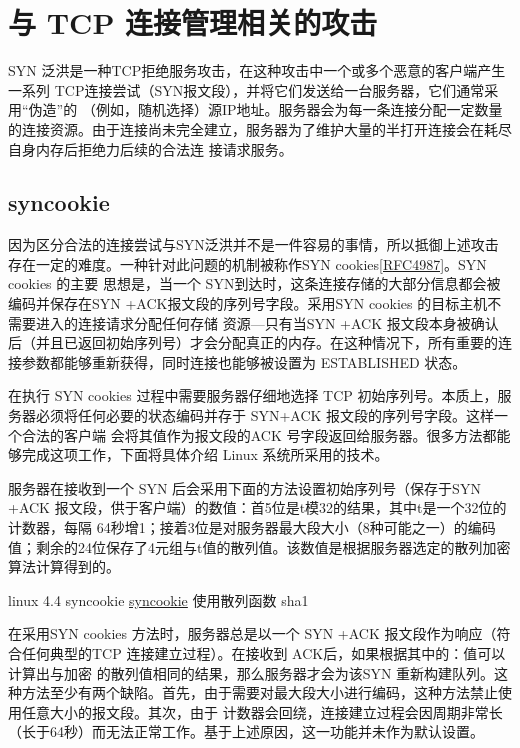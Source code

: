 \section{与 TCP 连接管理相关的攻击}
SYN 泛洪是一种TCP拒绝服务攻击，在这种攻击中一个或多个恶意的客户端产生一系列
TCP连接尝试（SYN报文段），并将它们发送给一台服务器，它们通常采用“伪造”的
（例如，随机选择）源IP地址。服务器会为每一条连接分配一定数量的连接资源。由于连接尚未完全建立，服务器为了维护大量的半打开连接会在耗尽自身内存后拒绝力后续的合法连
接请求服务。

\subsection{syncookie}
因为区分合法的连接尝试与SYN泛洪并不是一件容易的事情，所以抵御上述攻击存在一定的难度。一种针对此问题的机制被称作SYN
cookies\href{https://www.rfc-editor.org/rfc/rfc4987}{[RFC4987]}。SYN cookies 的主要
思想是，当一个 SYN到达时，这条连接存储的大部分信息都会被编码并保存在SYN +ACK报文段的序列号字段。采用SYN cookies
的目标主机不需要进入的连接请求分配任何存储
资源—只有当SYN +ACK
报文段本身被确认后（并且已返回初始序列号）才会分配真正的内存。在这种情况下，所有重要的连接参数都能够重新获得，同时连接也能够被设置为
ESTABLISHED 状态。

在执行 SYN cookies 过程中需要服务器仔细地选择 TCP 初始序列号。本质上，服务器必须将任何必要的状态编码并存于
SYN+ACK 报文段的序列号字段。这样一个合法的客户端
会将其值作为报文段的ACK 号字段返回给服务器。很多方法都能够完成这项工作，下面将具体介绍 Linux 系统所采用的技术。

服务器在接收到一个 SYN 后会采用下面的方法设置初始序列号（保存于SYN +ACK
报文段，供于客户端）的数值：首5位是t模32的结果，其中t是一个32位的计数器，每隔
64秒增1；接着3位是对服务器最大段大小（8种可能之一）的编码值；剩余的24位保存了4元组与t值的散列值。该数值是根据服务器选定的散列加密算法计算得到的。

\begin{tcolorbox}[title = {Note}]
  linux 4.4 syncookie
  \href{https://elixir.bootlin.com/linux/v4.4.302/source/net/ipv4/syncookies.c#L108}{syncookie}
  使用散列函数 sha1
\end{tcolorbox}

在采用SYN cookies 方法时，服务器总是以一个 SYN +ACK 报文段作为响应（符合任何典型的TCP 连接建立过程）。在接收到
ACK后，如果根据其中的：值可以计算出与加密
的散列值相同的结果，那么服务器才会为该SYN
重新构建队列。这种方法至少有两个缺陷。首先，由于需要对最大段大小进行编码，这种方法禁止使用任意大小的报文段。其次，由于
计数器会回绕，连接建立过程会因周期非常长（长于64秒）而无法正常工作。基于上述原因，这一功能并未作为默认设置。


